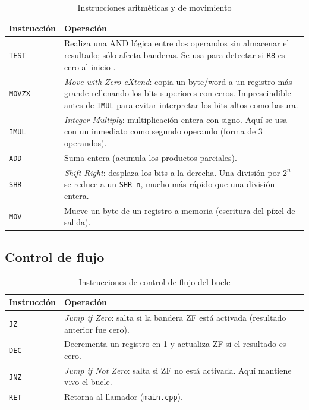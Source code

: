 \documentclass[12pt, letterpaper]{article}
\begin{document}
\begin{table}[H]
    \centering
    \begin{tabular}{@{}lp{10cm}@{}}
        \toprule
        \textbf{Instrucción} & \textbf{Operación} \\
        \midrule
        \texttt{TEST}  & Realiza una AND lógica entre dos operandos sin almacenar el resultado; sólo afecta banderas. Se usa para detectar si \texttt{R8} es cero al inicio \cite{intel_manual}. \\
        \texttt{MOVZX} & \textit{Move with Zero-eXtend}: copia un byte/word a un registro más grande rellenando los bits superiores con ceros. Imprescindible antes de \texttt{IMUL} para evitar interpretar los bits altos como basura. \\
        \texttt{IMUL}  & \textit{Integer Multiply}: multiplicación entera con signo. Aquí se usa con un inmediato como segundo operando (forma de 3 operandos). \\
        \texttt{ADD}   & Suma entera (acumula los productos parciales). \\
        \texttt{SHR}   & \textit{Shift Right}: desplaza los bits a la derecha. Una división por $2^n$ se reduce a un \texttt{SHR n}, mucho más rápido que una división entera. \\
        \texttt{MOV}   & Mueve un byte de un registro a memoria (escritura del píxel de salida). \\
        \bottomrule
    \end{tabular}
    \caption{Instrucciones aritméticas y de movimiento}
\end{table}

\subsection{Control de flujo}

\begin{table}[H]
    \centering
    \begin{tabular}{@{}lp{10cm}@{}}
        \toprule
        \textbf{Instrucción} & \textbf{Operación} \\
        \midrule
        \texttt{JZ}    & \textit{Jump if Zero}: salta si la bandera ZF está activada (resultado anterior fue cero). \\
        \texttt{DEC}   & Decrementa un registro en 1 y actualiza ZF si el resultado es cero. \\
        \texttt{JNZ}   & \textit{Jump if Not Zero}: salta si ZF no está activada. Aquí mantiene vivo el bucle. \\
        \texttt{RET}   & Retorna al llamador (\texttt{main.cpp}). \\
        \bottomrule
    \end{tabular}
    \caption{Instrucciones de control de flujo del bucle}
\end{table}
\end{document}
